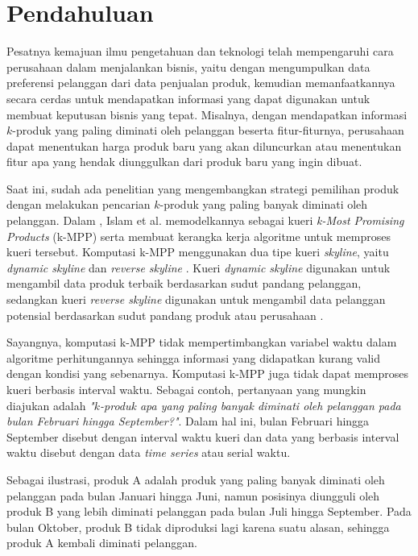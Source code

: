 \documentclass[conference]{IEEEtran}
\begin{document}
\section{Pendahuluan}
Pesatnya kemajuan ilmu pengetahuan dan teknologi telah mempengaruhi cara perusahaan dalam menjalankan bisnis, yaitu dengan mengumpulkan data preferensi pelanggan dari data penjualan produk, kemudian memanfaatkannya secara cerdas untuk mendapatkan informasi yang dapat digunakan untuk membuat keputusan bisnis yang tepat. Misalnya, dengan mendapatkan informasi $k$-produk yang paling diminati oleh pelanggan beserta fitur-fiturnya, perusahaan dapat menentukan harga produk baru yang akan diluncurkan atau menentukan fitur apa yang hendak diunggulkan dari produk baru yang ingin dibuat.

Saat ini, sudah ada penelitian yang mengembangkan strategi pemilihan produk dengan melakukan pencarian $k$-produk yang paling banyak diminati oleh pelanggan. Dalam \cite{kmpp}, Islam et al. memodelkannya sebagai kueri \textit{k-Most Promising Products} (k-MPP) serta membuat kerangka kerja algoritme untuk memproses kueri tersebut. Komputasi k-MPP menggunakan dua tipe kueri \textit{skyline}, yaitu \textit{dynamic skyline} \cite{dynamic-skyline} dan \textit{reverse skyline} \cite{reverse-skyline}. Kueri \textit{dynamic skyline} digunakan untuk mengambil data produk terbaik berdasarkan sudut pandang pelanggan, sedangkan kueri \textit{reverse skyline} digunakan untuk mengambil data pelanggan potensial berdasarkan sudut pandang produk atau perusahaan \cite{kmpp}.

Sayangnya, komputasi k-MPP tidak mempertimbangkan variabel waktu dalam algoritme perhitungannya sehingga informasi yang didapatkan kurang valid dengan kondisi yang sebenarnya. Komputasi k-MPP juga tidak dapat memproses kueri berbasis interval waktu. Sebagai contoh, pertanyaan yang mungkin diajukan adalah \textit{"$k$-produk apa yang paling banyak diminati oleh pelanggan pada bulan Februari hingga September?"}. Dalam hal ini, bulan Februari hingga September disebut dengan interval waktu kueri dan data yang berbasis interval waktu disebut dengan data \textit{time series} atau serial waktu.

Sebagai ilustrasi, produk A adalah produk yang paling banyak diminati oleh pelanggan pada bulan Januari hingga Juni, namun posisinya diungguli oleh produk B yang lebih diminati pelanggan pada bulan Juli hingga September. Pada bulan Oktober, produk B tidak diproduksi lagi karena suatu alasan, sehingga produk A kembali diminati pelanggan. 
\end{document}
